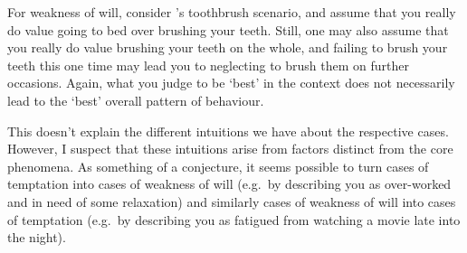 \documentclass[10pt]{article}
\begin{document}
For weakness of will, consider \citeauthor{Davidson:2001aa}'s toothbrush scenario, and assume that you really do value going to bed over brushing your teeth.
Still, one may also assume that you really do value brushing your teeth on the whole, and failing to brush your teeth this one time may lead you to neglecting to brush them on further occasions.
Again, what you judge to be `best' in the context does not necessarily lead to the `best' overall pattern of behaviour.

This doesn't explain the different intuitions we have about the respective cases.
However, I suspect that these intuitions arise from factors distinct from the core phenomena.
As something of a conjecture, it seems possible to turn cases of temptation into cases of weakness of will (e.g.\ by describing you as over-worked and in need of some relaxation) and similarly cases of weakness of will into cases of temptation (e.g.\ by describing you as fatigued from watching a movie late into the night).
\end{document}
